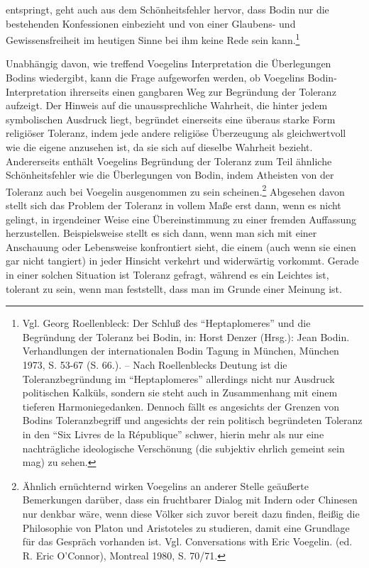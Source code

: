 entspringt, geht auch aus dem Schönheitsfehler hervor, dass Bodin nur die
bestehenden Konfessionen einbezieht und von einer Glaubens- und
Gewissensfreiheit im heutigen Sinne bei ihm keine Rede sein
kann.\footnote{Vgl. Georg Roellenbleck: Der Schluß des "`Heptaplomeres"' und
  die Begründung der Toleranz bei Bodin, in: Horst Denzer (Hrsg.): Jean Bodin.
  Verhandlungen der internationalen Bodin Tagung in München, München 1973, S.
  53-67 (S. 66.). -- Nach Roellenblecks Deutung ist die Toleranzbegründung im
  "`Heptaplomeres"' allerdings nicht nur Ausdruck politischen Kalküls, sondern
  sie steht auch in Zusammenhang mit einem tieferen Harmoniegedanken. Dennoch
  fällt es angesichts der Grenzen von Bodins Toleranzbegriff und angesichts
  der rein politisch begründeten Toleranz in den "`Six Livres de la
  République"' schwer, hierin mehr als nur eine nachträgliche ideologische
  Verschönung (die subjektiv ehrlich gemeint sein mag) zu sehen.}

Unabhängig davon, wie treffend Voegelins Interpretation die Überlegungen
Bodins wiedergibt, kann die Frage aufgeworfen werden, ob Voegelins
Bodin-Interpretation ihrerseits einen gangbaren Weg zur Begründung der
Toleranz aufzeigt. Der Hinweis auf die unaussprechliche Wahrheit, die hinter
jedem symbolischen Ausdruck liegt, begründet einerseits eine überaus starke
Form religiöser Toleranz, indem jede andere religiöse Überzeugung als
gleichwertvoll wie die eigene anzusehen ist, da sie sich auf dieselbe Wahrheit
bezieht. Andererseits enthält Voegelins Begründung der Toleranz zum Teil
ähnliche Schönheitsfehler wie die Überlegungen von Bodin, indem Atheisten von
der Toleranz auch bei Voegelin ausgenommen zu sein scheinen.\footnote{Ähnlich
  ernüchternd wirken Voegelins an anderer Stelle geäußerte Bemerkungen
  darüber, dass ein fruchtbarer Dialog mit Indern oder Chinesen nur denkbar
  wäre, wenn diese Völker sich zuvor bereit dazu finden, fleißig die
  Philosophie von Platon und Aristoteles zu studieren, damit eine Grundlage
  für das Gespräch vorhanden ist. Vgl.  Conversations with Eric Voegelin. (ed.
  R. Eric O'Connor), Montreal 1980, S. 70/71.} Abgesehen davon stellt sich das
Problem der Toleranz in vollem Maße erst dann, wenn es nicht gelingt, in
irgendeiner Weise eine Übereinstimmung zu einer fremden Auffassung
herzustellen.  Beispielsweise stellt es sich dann, wenn man sich mit einer
Anschauung oder Lebensweise konfrontiert sieht, die einem (auch wenn sie einen
gar nicht tangiert) in jeder Hinsicht verkehrt und widerwärtig vorkommt.
Gerade in einer solchen Situation ist Toleranz gefragt, während es ein
Leichtes ist, tolerant zu sein, wenn man feststellt, dass man im Grunde einer
Meinung ist.

